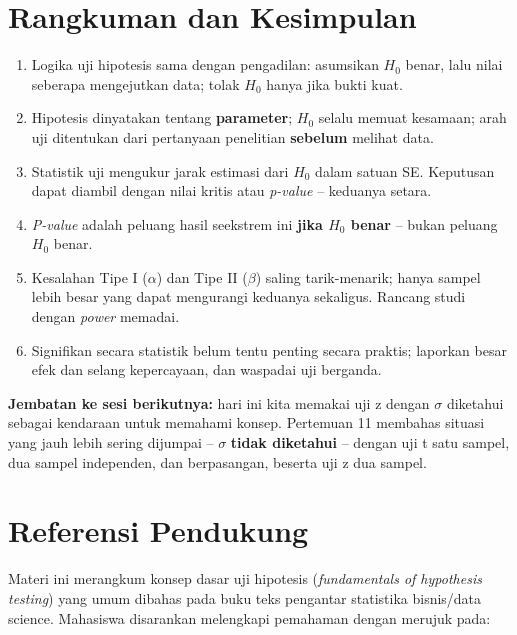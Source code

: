 \documentclass[
  indonesian,
  letterpaper,
]{book}
\providecommand{\tightlist}{%
  \setlength{\itemsep}{0pt}\setlength{\parskip}{0pt}}
\begin{document}

\chapter{Rangkuman dan Kesimpulan}\label{rangkuman-dan-kesimpulan-1}

\begin{enumerate}
\def\labelenumi{\arabic{enumi}.}
\tightlist
\item
  Logika uji hipotesis sama dengan pengadilan: asumsikan \(H_0\) benar,
  lalu nilai seberapa mengejutkan data; tolak \(H_0\) hanya jika bukti
  kuat.
\item
  Hipotesis dinyatakan tentang \textbf{parameter}; \(H_0\) selalu memuat
  kesamaan; arah uji ditentukan dari pertanyaan penelitian
  \textbf{sebelum} melihat data.
\item
  Statistik uji mengukur jarak estimasi dari \(H_0\) dalam satuan SE.
  Keputusan dapat diambil dengan nilai kritis atau \emph{p-value} --
  keduanya setara.
\item
  \emph{P-value} adalah peluang hasil seekstrem ini \textbf{jika \(H_0\)
  benar} -- bukan peluang \(H_0\) benar.
\item
  Kesalahan Tipe I (\(\alpha\)) dan Tipe II (\(\beta\)) saling
  tarik-menarik; hanya sampel lebih besar yang dapat mengurangi keduanya
  sekaligus. Rancang studi dengan \emph{power} memadai.
\item
  Signifikan secara statistik belum tentu penting secara praktis;
  laporkan besar efek dan selang kepercayaan, dan waspadai uji berganda.
\end{enumerate}

\textbf{Jembatan ke sesi berikutnya:} hari ini kita memakai uji z dengan
\(\sigma\) diketahui sebagai kendaraan untuk memahami konsep. Pertemuan
11 membahas situasi yang jauh lebih sering dijumpai -- \(\sigma\)
\textbf{tidak diketahui} -- dengan uji t satu sampel, dua sampel
independen, dan berpasangan, beserta uji z dua sampel.


\chapter{Referensi Pendukung}\label{referensi-pendukung-1}

Materi ini merangkum konsep dasar uji hipotesis (\emph{fundamentals of
hypothesis testing}) yang umum dibahas pada buku teks pengantar
statistika bisnis/data science. Mahasiswa disarankan melengkapi
pemahaman dengan merujuk pada:
\end{document}
